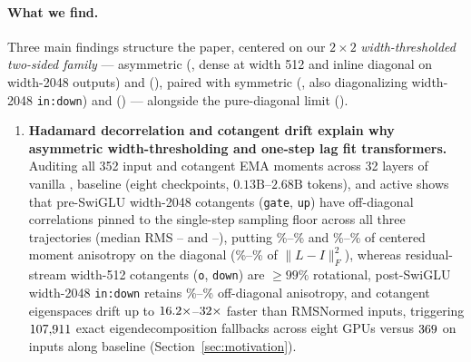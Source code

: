 \paragraph{What we find.}
Three main findings structure the paper, centered on our $2\times 2$
\emph{width-thresholded two-sided family} --- asymmetric 
(\mlpdiag{}, dense at width 512 and inline diagonal on width-2048 outputs) and
 (\mlpdiaglag{}), paired with symmetric 
(\symmlpdiag{}, also diagonalizing width-2048 \texttt{in:down}) and
 (\symmlpdiaglag{}) --- alongside the pure-diagonal limit
 (\alldiag{}).

\begin{enumerate}
\item \textbf{Hadamard decorrelation and cotangent drift explain why asymmetric
  width-thresholding and one-step lag fit transformers.}
  Auditing all 352 input and cotangent EMA moments across 32 layers of vanilla
  , baseline  (eight checkpoints,
  $0.13\text{B}$--$2.68\text{B}$ tokens), and active  shows
  that pre-SwiGLU width-2048 cotangents (\texttt{gate}, \texttt{up}) have
  off-diagonal correlations pinned to the single-step sampling floor across all
  three trajectories (median RMS
  \motWtOutGateCorrRmsMed{}--\motMuonOutGateCorrRmsMed{} and
  \motMuonOutUpCorrRmsMed{}--\motWtOutUpCorrRmsMed{}), putting
  \motMuonOutGateDiagAnisoMedPct\%--\motWtOutGateDiagAnisoMedPct\% and
  \motMuonOutUpDiagAnisoMedPct\%--\motWtOutUpDiagAnisoMedPct\% of centered
  moment anisotropy on the diagonal
  (\motOutUpExpVarLMedPct\%--\motMuonOutGateExpVarLMedPct\% of $\|L - I\|_F^2$),
  whereas residual-stream width-512 cotangents (\texttt{o}, \texttt{down}) are
  $\ge 99\%$ rotational, post-SwiGLU width-2048 \texttt{in:down} retains
  \motInDownOffdiagAnisoMedPct\%--\motMuonInDownOffdiagAnisoMedPct\%
  off-diagonal anisotropy, and cotangent eigenspaces drift up to
  $16.2\times$--$32\times$
  faster than RMSNormed inputs, triggering $107{,}911{}$ exact
  eigendecomposition fallbacks across eight GPUs versus $369{}$ on
  inputs along baseline  (Section~\ref{sec:motivation}).


\end{enumerate}
